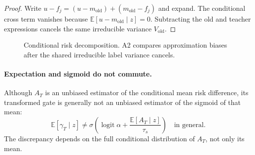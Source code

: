 \documentclass[11pt,a4paper]{article}
\newcommand{\E}{\mathbb{E}}
\newcommand{\norm}[1]{\left\lVert #1\right\rVert}
\newcommand{\logit}{\operatorname{logit}}
\newcommand{\old}{\mathrm{old}}
\theoremstyle{plain}
\theoremstyle{definition}
\begin{document}
\begin{proof}
Write $u-f_j=(u-m_{\old})+(m_{\old}-f_j)$ and expand.  The conditional cross term vanishes because
$\E[u-m_{\old}\mid z]=0$.  Subtracting the old and teacher expressions cancels the same
irreducible variance $V_{\old}$.
\end{proof}

\begin{figure}[htbp]
\centering
{}
\caption{Conditional risk decomposition.  A2 compares approximation biases after the shared
irreducible label variance cancels.}
\label{fig:risk-decomposition}
\end{figure}

\paragraph{Expectation and sigmoid do not commute.}
Although $A_T$ is an unbiased estimator of the conditional mean risk difference, its transformed
gate is generally not an unbiased estimator of the sigmoid of that mean:
\begin{equation}
\E[\gamma_T\mid z]\ne
\sigma\!\left(\logit\alpha+\frac{\E[A_T\mid z]}{\tau_s}\right)
\quad\text{in general}.
\label{eq:sigmoid-bias}
\end{equation}
The discrepancy depends on the full conditional distribution of $A_T$, not only its mean.
\end{document}
